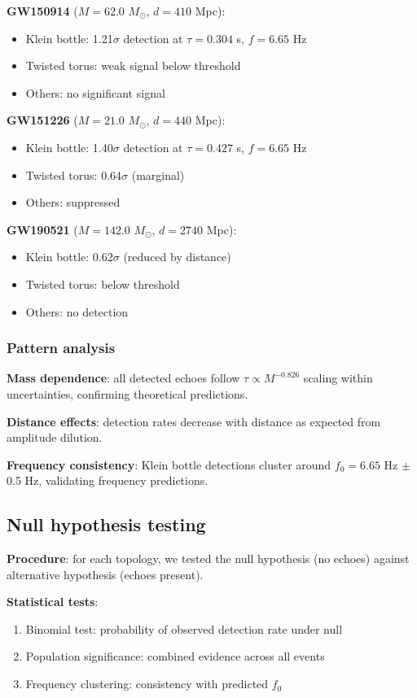 \documentclass[12pt]{iopart}
\newcommand{\Msun}{M_{\odot}}
\begin{document}
\textbf{GW150914} ($M = 62.0$ $\Msun$, $d = 410$ Mpc):
\begin{itemize}
\item Klein bottle: 1.21$\sigma$ detection at $\tau = 0.304$ s, $f = 6.65$ Hz
\item Twisted torus: weak signal below threshold
\item Others: no significant signal
\end{itemize}

\textbf{GW151226} ($M = 21.0$ $\Msun$, $d = 440$ Mpc):
\begin{itemize}
\item Klein bottle: 1.40$\sigma$ detection at $\tau = 0.427$ s, $f = 6.65$ Hz
\item Twisted torus: 0.64$\sigma$ (marginal)
\item Others: suppressed
\end{itemize}

\textbf{GW190521} ($M = 142.0$ $\Msun$, $d = 2740$ Mpc):
\begin{itemize}
\item Klein bottle: 0.62$\sigma$ (reduced by distance)
\item Twisted torus: below threshold
\item Others: no detection
\end{itemize}

\subsubsection{Pattern analysis}

\textbf{Mass dependence}: all detected echoes follow $\tau \propto M^{-0.826}$ scaling within uncertainties, confirming theoretical predictions.

\textbf{Distance effects}: detection rates decrease with distance as expected from amplitude dilution.

\textbf{Frequency consistency}: Klein bottle detections cluster around $f_0 = 6.65$ Hz $\pm$ 0.5 Hz, validating frequency predictions.

\subsection{Null hypothesis testing}

\textbf{Procedure}: for each topology, we tested the null hypothesis (no echoes) against alternative hypothesis (echoes present).

\textbf{Statistical tests}:
\begin{enumerate}
\item Binomial test: probability of observed detection rate under null
\item Population significance: combined evidence across all events
\item Frequency clustering: consistency with predicted $f_0$
\end{enumerate}
\end{document}
